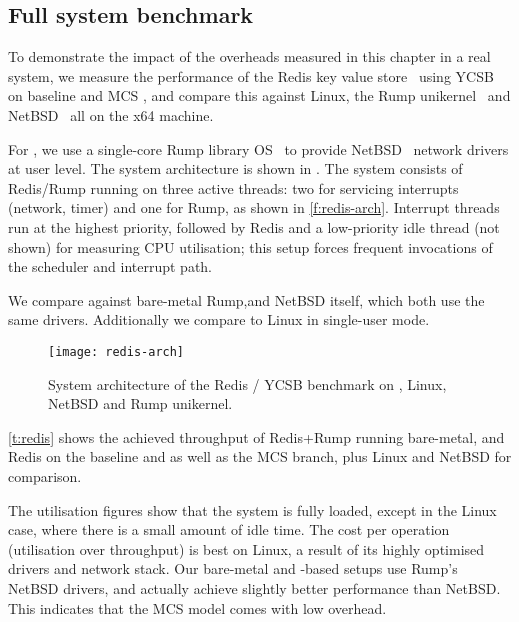 \subsection{Full system benchmark}
\label{s:evaluation-redis-overhead}

To demonstrate the impact of the overheads measured in this chapter in a real system,
we measure the performance of the Redis key value store~\citep{redis:url} using 
\gls{YCSB}~\citep{Cooper_STRS_10} on baseline and MCS \selfour, and compare this
against Linux, the Rump unikernel~\citep{Kantee_Cormack_14} and 
NetBSD~\citep{NetBSD:url} all on the x64 machine.

For \selfour, we use a single-core Rump library OS~\citep{Kantee_Cormack_14} to provide 
NetBSD~\citep{NetBSD:url} network drivers at user level. The system architecture is 
shown in \label{f:redis-arch}. 
The system consists of Redis/Rump running on three active \selfour threads: 
two for servicing interrupts (network, timer) and one for Rump, as shown in
\autoref{f:redis-arch}. Interrupt threads run at the highest priority,
followed by Redis and a low-priority idle thread (not shown) for measuring CPU utilisation;
this setup forces frequent invocations of the scheduler and interrupt path.

We compare against bare-metal Rump,and
NetBSD itself, which both use the same drivers. Additionally we compare to Linux 
in single-user mode. 

 \begin{figure}[ht]
    \centering
    \texttt{[image: redis-arch]}
    \caption{System architecture of the Redis / \gls{YCSB} benchmark on \selfour, 
        Linux, NetBSD and Rump unikernel.}
    \label{f:redis-arch}
\end{figure}


\autoref{t:redis} shows the achieved throughput of Redis+Rump
running  bare-metal, and Redis on the \selfour baseline and as well as the MCS
branch, plus Linux and NetBSD for comparison.

The utilisation figures show that the system is fully loaded, except
in the Linux case, where there is a small amount of idle time. The
cost per operation (utilisation over throughput) is best on Linux, a
result of its highly optimised drivers and network stack. Our
bare-metal and \selfour-based setups use Rump's NetBSD drivers, and
actually achieve slightly better performance than NetBSD. This
indicates that the MCS model comes with low overhead.

